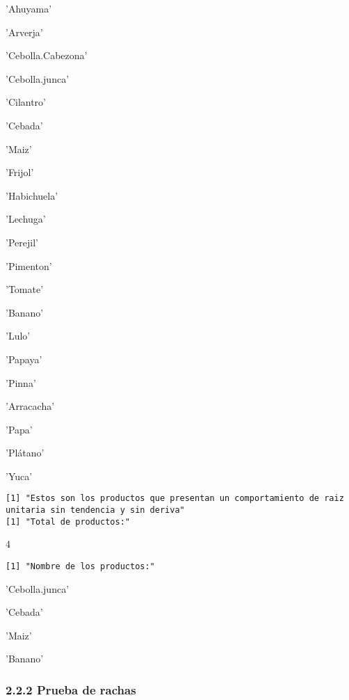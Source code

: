\documentclass[11pt]{article}
\begin{document}
    \begin{enumerate*}
\item 'Ahuyama'
\item 'Arverja'
\item 'Cebolla.Cabezona'
\item 'Cebolla.junca'
\item 'Cilantro'
\item 'Cebada'
\item 'Maiz'
\item 'Frijol'
\item 'Habichuela'
\item 'Lechuga'
\item 'Perejil'
\item 'Pimenton'
\item 'Tomate'
\item 'Banano'
\item 'Lulo'
\item 'Papaya'
\item 'Pinna'
\item 'Arracacha'
\item 'Papa'
\item 'Plátano'
\item 'Yuca'
\end{enumerate*}


    
    \begin{Verbatim}[commandchars=\\\{\}]
[1] "Estos son los productos que presentan un comportamiento de raiz unitaria sin tendencia y sin deriva"
[1] "Total de productos:"

    \end{Verbatim}

    4

    
    \begin{Verbatim}[commandchars=\\\{\}]
[1] "Nombre de los productos:"

    \end{Verbatim}

    \begin{enumerate*}
\item 'Cebolla.junca'
\item 'Cebada'
\item 'Maiz'
\item 'Banano'
\end{enumerate*}


    
    \hypertarget{prueba-de-rachas}{%
\subsubsection{2.2.2 Prueba de rachas}\label{prueba-de-rachas}}
\end{document}
